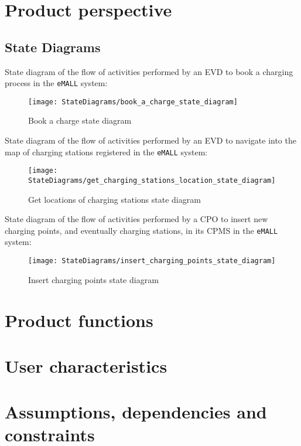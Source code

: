 \section{Product perspective}\label{sec:product_perspective}
\subsection{State Diagrams}
State diagram of the flow of activities performed by an EVD to book a charging process in the \verb|eMALL| system:
\begin{figure}[H]
    \centering
    \texttt{[image: StateDiagrams/book\_a\_charge\_state\_diagram]}
    \caption{Book a charge state diagram}
    \label{fig: booking_sd}
\end{figure}
State diagram of the flow of activities performed by an EVD to navigate into the map of charging stations registered
in the \verb|eMALL| system:
\begin{figure}[H]
    \centering
    \texttt{[image: StateDiagrams/get\_charging\_stations\_location\_state\_diagram]}
    \caption{Get locations of charging stations state diagram}
    \label{fig: locations_sd}
\end{figure}
State diagram of the flow of activities performed by a CPO to insert new charging points, and eventually charging stations,
in its CPMS in the \verb|eMALL| system:
\begin{figure}[H]
    \centering
    \texttt{[image: StateDiagrams/insert\_charging\_points\_state\_diagram]}
    \caption{Insert charging points state diagram}
    \label{fig: insert_charging_points_sd}
\end{figure}

\section{Product functions}\label{sec:product_functions}


\section{User characteristics}\label{sec:user_characteristics}


\section{Assumptions, dependencies and constraints}\label{sec:assumptions_dependencies_and_constraints}